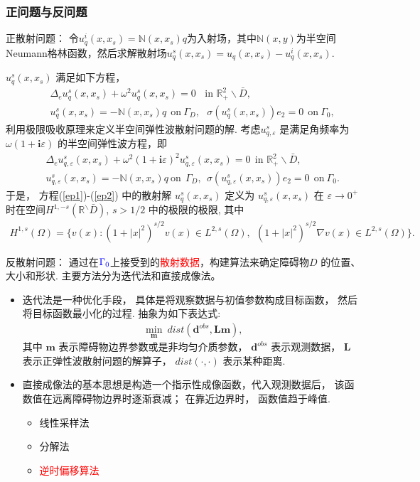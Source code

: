 \documentclass[8pt]{beamer}
\newcommand{\R}{\mathbb{R}}
\renewcommand{\i}{\mathbf{i}}
\newcommand{\om}{\omega}
\newcommand{\ep}{\varepsilon}
\newcommand{\Ga}{\Gamma}
\newcommand{\Om}{\Omega}
\newcommand{\bks}{\backslash}
\renewcommand{\i}{\mathbf{i}}
\newcommand{\N}{\mathbb{N}}
\newcommand{\be}{\begin{eqnarray}}
\newcommand{\ee}{\end{eqnarray}}
\newcommand{\ben}{\begin{eqnarray*}}
\newcommand{\een}{\end{eqnarray*}}
\begin{document}
\begin{frame}
\frametitle{正问题与反问题}
	\begin{block}{正散射问题：}
		令$u^i_q(x,x_s)=\N(x,x_s)q$为入射场，其中$\N(x,y)$为半空间Neumann格林函数，然后求解散射场$u^s_q(x,x_s)=u_q(x,x_s)-u^i_q(x,x_s)$.
	\end{block}
\pause
$u_q^s(x,x_s)$ 满足如下方程，
\be
& &\Delta_e u_q^s(x,x_s)+ \omega^2u_q^s(x,x_s)= 0 \ \ \ \ \mbox{in }\R_+^2\bks \bar{D},\label{ep1}\\
& &u^s_q(x,x_s)=-\N(x,x_s)q \ \ \mbox{on} \ \Ga_D,\ \ \ \sigma(u_q^s(x,x_s))e_2=0 \ \ \mbox{on} \ \Ga_0,\label{ep2}
\ee
\pause
利用极限吸收原理来定义半空间弹性波散射问题的解.  考虑$u^s_{q,\ep}$ 是满足角频率为 $\om(1+\i\ep)$ 的半空间弹性波方程，即
\ben
& &\Delta_e u_{q,\ep}^s(x,x_s)+ \omega^2(1+\i\ep)^2 u_{q,\ep}^s(x,x_s)= 0 \ \  \mbox{in }\R_+^2\bks \bar{D},\label{p12}\\
& &u^s_{q,\ep}(x,x_s)=-\N(x,x_s)q \  \mbox{on} \ \  \Ga_D,\ \ \sigma(u_{q,\ep}^s(x,x_s))e_2=0 \ \  \mbox{on} \  \Ga_0 .\label{p22}
\een
于是， 方程(\ref{ep1})-(\ref{ep2}) 中的散射解 $u_q^s(x,x_s)$ 定义为 $u_{q,\ep}^s(x,x_s)$ 在 $\ep\to 0^+$ 时在空间$H^{1,-s}(\R^\bks\bar{D})$, $s>1/2$ 中的极限的极限, 其中
\ben
H^{1,s}(\Om)=\{v(x): (1+|x|^2)^{s/2}v(x)\in L^{2,s}(\Om) , \ \  (1+|x|^2)^{s/2}\nabla v(x)\in L^{2,s}(\Om)   \}.
\een
\end{frame}

\begin{frame}
	\begin{block}{反散射问题：}
		 通过在$\textcolor{blue}{\Gamma_0}$上接受到的\textcolor{red}{散射数据}，构建算法来确定障碍物$D$ 的位置、大小和形状. 主要方法分为迭代法和直接成像法。
	\end{block}
\vspace{.5cm}
\pause
\begin{itemize}
	\item 迭代法是一种优化手段， 具体是将观察数据与初值参数构成目标函数， 然后将目标函数最小化的过程.  抽象为如下表达式:
	\ben
	\min_{\mathbf{m}} \ dist(\mathbf{d}^{obs},\mathbf{{L}}\mathbf{m}),
	\een
	其中 $\mathbf m$ 表示障碍物边界参数或是非均匀介质参数， $\mathbf{d}^{obs}$ 表示观测数据， $\mathbf{{L}}$ 表示正弹性波散射问题的解算子， $dist(\cdot,\cdot)$ 表示某种距离.
	
	\bigskip
	\pause
	\item 直接成像法的基本思想是构造一个指示性成像函数，代入观测数据后， 该函数值在远离障碍物边界时逐渐衰减； 在靠近边界时， 函数值趋于峰值.
	\begin{itemize}
		\item 线性采样法
		\item 分解法
		\item \textcolor{red}{逆时偏移算法}
	\end{itemize}
\end{itemize} 
\end{frame}
\end{document}
